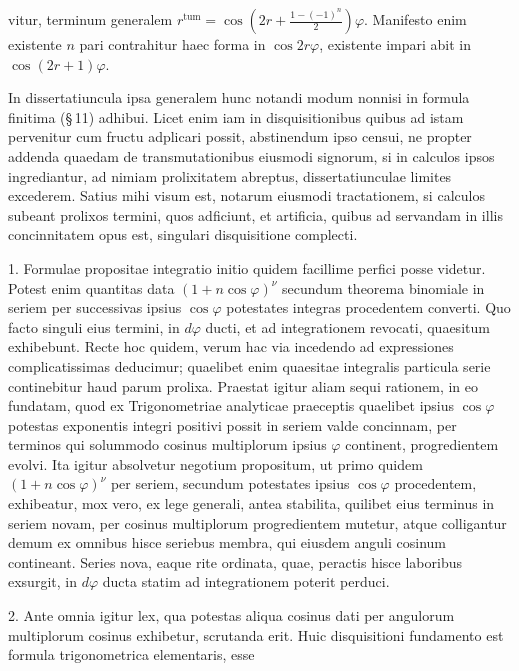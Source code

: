 vitur, terminum generalem $r^{\text{tum}} = \cos\left(2r+\frac{1-(-1)^n}{2}\right)\varphi$.
Manifesto enim existente $n$ pari contrahitur haec forma in $\cos 2r\varphi$,
existente impari abit in $\cos(2r+1)\varphi$.

In dissertatiuncula ipsa generalem hunc notandi modum nonnisi in formula
finitima (\S\,11) adhibui. Licet enim iam in disquisitionibus quibus ad
istam pervenitur cum fructu adplicari possit, abstinendum ipso censui, ne
propter addenda quaedam de transmutationibus eiusmodi signorum, si in
calculos ipsos ingrediantur, ad nimiam prolixitatem abreptus,
dissertatiunculae limites excederem. Satius mihi visum est, notarum
eiusmodi tractationem, si calculos subeant prolixos termini, quos
adficiunt, et artificia, quibus ad servandam in illis concinnitatem opus
est, singulari disquisitione complecti.

1. Formulae propositae integratio initio quidem facillime perfici posse
videtur. Potest enim quantitas data $(1+n\cos\varphi)^\nu$ secundum
theorema binomiale in seriem per successivas ipsius $\cos\varphi$
potestates integras procedentem converti. Quo facto singuli eius termini,
in $d\varphi$ ducti, et ad integrationem revocati, quaesitum exhibebunt.
Recte hoc quidem, verum hac via incedendo ad expressiones complicatissimas
deducimur; quaelibet enim quaesitae integralis particula serie continebitur
haud parum prolixa. Praestat igitur aliam sequi rationem, in eo fundatam,
quod ex Trigonometriae analyticae praeceptis quaelibet ipsius $\cos\varphi$
potestas exponentis integri positivi possit in seriem valde concinnam, per
terminos qui solummodo cosinus multiplorum ipsius $\varphi$ continent,
progredientem evolvi. Ita igitur absolvetur negotium propositum, ut primo
quidem $(1+n\cos\varphi)^\nu$ per seriem, secundum potestates ipsius
$\cos\varphi$ procedentem, exhibeatur, mox vero, ex lege generali, antea
stabilita, quilibet eius terminus in seriem novam, per cosinus multiplorum
progredientem mutetur, atque colligantur demum ex omnibus hisce seriebus
membra, qui eiusdem anguli cosinum contineant. Series nova, eaque rite
ordinata, quae, peractis hisce laboribus exsurgit, in $d\varphi$ ducta
statim ad integrationem poterit perduci.

2. Ante omnia igitur lex, qua potestas aliqua cosinus dati per angulorum
multiplorum cosinus exhibetur, scrutanda erit. Huic disquisitioni
fundamento est formula trigonometrica elementaris, esse
